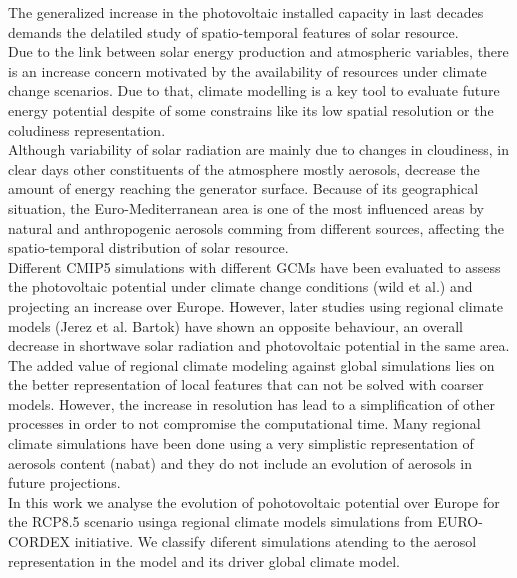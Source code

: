     The generalized increase in the photovoltaic installed capacity in last decades demands the delatiled study of spatio-temporal features of solar resource.\\

  Due to the link between solar energy production and atmospheric variables, there is an increase concern motivated by the availability of resources under climate change scenarios. Due to that, climate modelling is a key tool to evaluate future energy potential despite of some constrains like its low spatial resolution or the coludiness representation.\\
  
   Although variability of solar radiation are mainly due to changes in cloudiness, in clear days other constituents of the atmosphere mostly aerosols, decrease the amount of energy reaching the generator surface. Because of its geographical situation, the Euro-Mediterranean area is one of the most influenced areas by natural and anthropogenic aerosols comming from different sources, affecting the spatio-temporal distribution of solar resource.\\

   Different CMIP5 simulations with different GCMs have been evaluated to assess the photovoltaic potential under climate change conditions (wild et al.) and projecting an increase over Europe. However, later studies using regional climate models (Jerez et al. Bartok) have shown an opposite behaviour, an overall decrease in shortwave solar radiation and photovoltaic potential in the same area.\\

   The added value of regional climate modeling against global simulations lies on the better representation of local features that can not be solved with coarser models. However, the increase in resolution has lead to a simplification of other processes in order to not compromise the computational time. Many regional climate simulations have been done using a very simplistic representation of aerosols content (nabat) and they do not include an evolution of aerosols in future projections.\\
   
   In this work we analyse the evolution of pohotovoltaic potential over Europe for the RCP8.5 scenario usinga regional climate models simulations from EURO-CORDEX initiative. We classify diferent simulations atending to the aerosol representation in the model and its driver global climate model.\\

